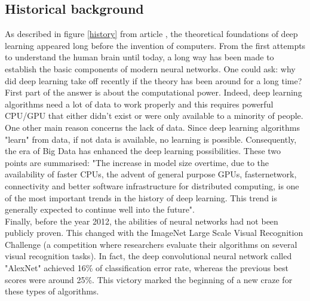 \subsection{Historical background}
\label{historical_background}
As described in figure \ref{history} from article \cite{14}, the theoretical foundations of deep learning appeared long before the invention of computers. From the first attempts to understand the human brain until today, a long way has been made to establish the basic components of modern neural networks. One could ask: why did deep learning take off recently if the theory has been around for a long time?\\
First part of the answer is about the computational power. Indeed, deep learning algorithms need a lot of data to work properly and this requires powerful CPU/GPU that either didn't exist or were only available to a minority of people. One other main reason concerns the lack of data. Since deep learning algorithms "learn" from data, if not data is available, no learning is possible. Consequently, the era of Big Data has enhanced the deep learning possibilities. These two points are summarised: "The increase in model size overtime, due to the availability of faster CPUs, the advent of general purpose GPUs, fasternetwork, connectivity and better software infrastructure for distributed computing, is one of the most important trends in the history of deep learning. This trend is generally expected to continue well into the future"\cite{15}.\\
Finally, before the year 2012, the abilities of neural networks had not been publicly proven. This changed with the ImageNet Large Scale Visual Recognition Challenge (a competition where researchers evaluate their algorithms on several visual recognition tasks). In fact, the deep convolutional neural network called "AlexNet" achieved 16\% of classification error rate, whereas the previous best scores were around 25\%. This victory marked the beginning of a new craze for these types of algorithms.



